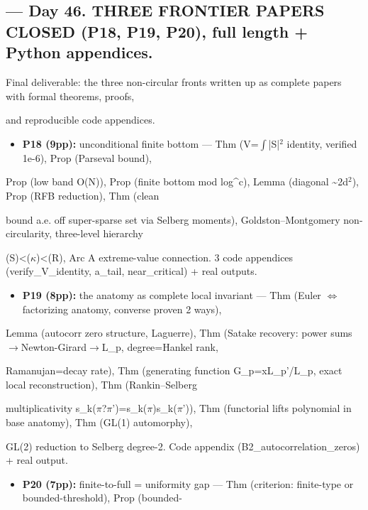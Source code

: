 \documentclass[10pt]{article}
\begin{document}
\subsection*{ --- Day 46. THREE FRONTIER PAPERS CLOSED (P18, P19, P20), full length + Python appendices.}
Final deliverable: the three non-circular fronts written up as complete papers with formal theorems, proofs,\par
and reproducible code appendices.\par
\begin{itemize}
\item \textbf{P18 (9pp):} unconditional finite bottom --- Thm (V=\ensuremath{\int}|S|\ensuremath{^2} identity, verified 1e-6), Prop (Parseval bound),
\end{itemize}
  Prop (low band O(N)), Prop (finite bottom mod log\textasciicircum{}c), Lemma (diagonal \textasciitilde{}2d\ensuremath{^2}), Prop (RFB reduction), Thm (clean\par
  bound a.e. off super-sparse set via Selberg moments), Goldston--Montgomery non-circularity, three-level hierarchy\par
  (S)<(\ensuremath{\kappa})<(R), Arc A extreme-value connection. 3 code appendices (verify\_V\_identity, a\_tail, near\_critical) + real outputs.\par
\begin{itemize}
\item \textbf{P19 (8pp):} the anatomy as complete local invariant --- Thm (Euler \ensuremath{\iff} factorizing anatomy, converse proven 2 ways),
\end{itemize}
  Lemma (autocorr zero structure, Laguerre), Thm (Satake recovery: power sums\ensuremath{\to}Newton-Girard\ensuremath{\to}L\_p, degree=Hankel rank,\par
  Ramanujan=decay rate), Thm (generating function G\_p=xL\_p'/L\_p, exact local reconstruction), Thm (Rankin--Selberg\par
  multiplicativity s\_k(\ensuremath{\pi}?\ensuremath{\pi}')=s\_k(\ensuremath{\pi})s\_k(\ensuremath{\pi}')), Thm (functorial lifts polynomial in base anatomy), Thm (GL(1) automorphy),\par
  GL(2) reduction to Selberg degree-2. Code appendix (B2\_autocorrelation\_zeros) + real output.\par
\begin{itemize}
\item \textbf{P20 (7pp):} finite-to-full = uniformity gap --- Thm (criterion: finite-type or bounded-threshold), Prop (bounded-
\end{itemize}
\end{document}
